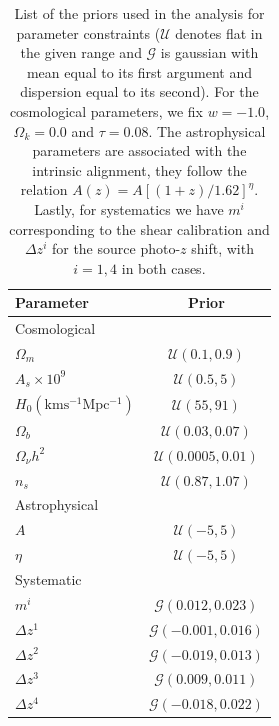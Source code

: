 \documentclass[twocolumn]{\docclass}
\begin{document}
	
	
	\begin{table}
		\centering
		\begin{tabular} { l c} 
			\hline
			\hline
			Parameter							& Prior	\\ \hline
			Cosmological & \\ [1ex]
			$\Omega_m$						& $\mathcal{U}(0.1, 0.9)$		\\
			$A_s \times 10^9$					& $\mathcal{U}(0.5, 5)$		\\
			$H_0 \mathrm{(km s^{-1} Mpc^{-1})}$	& $\mathcal{U}(55, 91)$		\\
			$\Omega_b$						& $\mathcal{U}(0.03, 0.07)$	\\
			$\Omega_\nu h^2$					& $\mathcal{U}(0.0005, 0.01)$	\\
			$n_s$							& $\mathcal{U}(0.87, 1.07)$	\\ [1ex]
			\hline
			Astrophysical & \\ [1ex]
			$A$								& $\mathcal{U}(-5, 5)$ \\
			$\eta$							& $\mathcal{U}(-5, 5)$ \\ [1ex]
			\hline
			Systematic & \\ [1ex]
			$m^i$							& $\mathcal{G}(0.012, 0.023)$	 \\
			$\Delta z^1$						& $\mathcal{G}(-0.001, 0.016)$	 \\
			$\Delta z^2$						& $\mathcal{G}(-0.019, 0.013)$	 \\
			$\Delta z^3$						& $\mathcal{G}(0.009, 0.011)$	 \\
			$\Delta z^4$						& $\mathcal{G}(-0.018, 0.022)$	 \\ [1ex]
			\hline
			\hline
		\end{tabular}
		\caption{List of the priors used in the analysis for parameter constraints ($\mathcal{U}$ denotes flat in the given range and $\mathcal{G}$ is gaussian with mean equal to its first argument and dispersion equal to its second). For the cosmological parameters, we fix $w = -1.0$, $\Omega_k =  0.0$ and $\tau =  0.08$. The astrophysical parameters are associated with the intrinsic alignment, they follow the relation $A(z) = A[(1+z)/1.62]^{\eta}$. Lastly, for systematics we have $m^i$ corresponding to the shear calibration and  $\Delta z^i$ for the source photo-$z$ shift, with $i = 1, 4$ in both cases.}
		\label{tab:constraints}
	\end{table}
	
\end{document}
